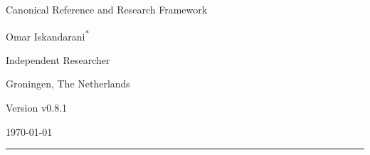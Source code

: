 \documentclass[11pt]{article}
\theoremstyle{definition}
\theoremstyle{plain}
\theoremstyle{remark}
\begin{document}
    
    \thispagestyle{empty}

    \begin{center}
        \vspace*{0.06\textheight}

        {\LARGE\bfseries \papertitle\par}
        \vspace{0.45cm}

        {\large Canonical Reference and Research Framework\par}
        \vspace{1.0cm}

        {\Large Omar Iskandarani\textsuperscript{*}\par}
        \vspace{0.35cm}

        {\normalsize Independent Researcher\par}
        {\normalsize Groningen, The Netherlands\par}
        \vspace{0.6cm}

        {\normalsize Version v0.8.1\par}
        {\normalsize \today\par}
        \vspace{0.9cm}

        \rule{0.82\textwidth}{0.5pt}
        \vspace{0.7cm}
    \end{center}

    \begin{abstract}
        \noindent
        This document presents Swirl-String Theory (SST) as a structured canonical synthesis rather than as a claim that every phenomenological sector has already been derived to theorem level. The text consolidates the primitive constant chain linking the effective fluid density, characteristic swirl speed, Compton anchoring, and core scale; records delay-induced mode selection as the preferred non-operator route to spectral discreteness; and organizes the atomic bridge, spectroscopic filter, relational-time sector, and topology-based mass program within one explicitly stratified framework. Throughout, orthodox inputs, SST-internal derivations, bridge-level constructions, and conjectural extensions are kept distinct so that the canon remains internally coherent, externally comparable, and open to falsification.
    \end{abstract}
\end{document}
